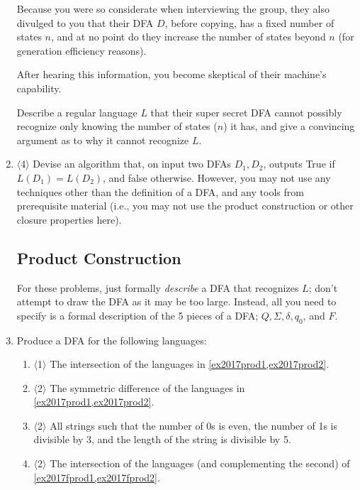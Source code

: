 \documentclass[a4paper,american,12pt]{book}
\newcommand{\Level}[1]{{\color{blue} $\langle$#1$\rangle$}}
\begin{document}
\begin{enumerate}
Because you were so considerate when interviewing the group, they also divulged to you that their DFA $D$, before copying, has a fixed number of states $n$, and at no point do they increase the number of states beyond $n$ (for generation efficiency reasons).

After hearing this information, you become skeptical of their machine's capability.

Describe a regular language $L$ that their super secret DFA cannot possibly recognize only knowing the number of states ($n$) it has, and give a convincing argument as to why it cannot recognize $L$.

\item \label{dfa_equal_no_product} \Level{4} Devise an algorithm that, on input two DFAs $D_1, D_2$, outputs True if $L(D_1) = L(D_2)$, and false otherwise.
However, you may not use any techniques other than the definition of a DFA, and any tools from prerequisite material (i.e., you may not use the product construction or other closure properties here).

\subsection{Product Construction}

For these problems, just formally \emph{describe} a DFA that recognizes $L$; don't attempt to draw the DFA as it may be too large. 
Instead, all you need to specify is a formal description of the 5 pieces of a DFA; $Q, \Sigma, \delta, q_0$, and $F$.

\item Produce a DFA for the following languages:
\begin{enumerate}


\item \Level{1} The intersection of the languages in \cref{ex2017prod1,ex2017prod2}.

\item \Level{2} The symmetric difference of the languages in \cref{ex2017prod1,ex2017prod2}.

\item \Level{2} All strings such that the number of 0s is even, the number of 1s is divisible by 3, and the length of the string is divisible by 5.

\item \Level{2} The intersection of the languages (and complementing the second) of \cref{ex2017fprod1,ex2017fprod2}.


\end{enumerate}
\end{enumerate}
\end{document}
